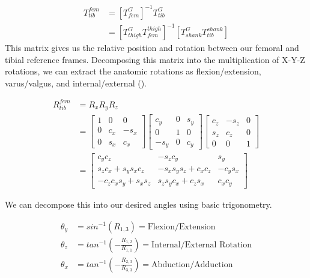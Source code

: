\documentclass{article}
\begin{document}
    \begin{equation}
        \begin{aligned}
            T^{fem}_{tib} &= [T^{G}_{fem}]^{-1}T^{G}_{tib} \\
            &= [T^{G}_{thigh}T^{thigh}_{fem}]^{-1}[T^{G}_{shank}T^{shank}_{tib}]
        \end{aligned}
        \label{t_fem_tib}
    \end{equation}
    This matrix gives us the relative position and rotation between our femoral and tibial reference frames. Decomposing this matrix into the multiplication of X-Y-Z rotations, we can extract the anatomic rotations as flexion/extension, varus/valgus, and internal/external ().

    \begin{equation}
        \begin{aligned}
            R^{fem}_{tib} & = R_{x}R_{y}R_{z}\\
            &= \begin{bmatrix}1 & 0 & 0 \\ 0 & c_{x} & -s_{x} \\ 0 & s_{x} & c_{x} \end{bmatrix}
            \begin{bmatrix}c_{y} & 0 & s_{y}\\ 0 & 1 & 0 \\ -s_{y} & 0 & c_{y} \end{bmatrix}
            \begin{bmatrix} c_{z} & -s_{z} & 0 \\ s_{z} & c_{z} & 0 \\ 0 & 0 & 1 \end{bmatrix}\\
            &= \begin{bmatrix}
                c_{y}c_{z} & -s_{z}c_{y} & s_{y} \\
                s_{z}c_{x} + s_{y}s_{x}c_{z} & -s_{x}s_{y}s_{z} + c_{x}c_{z} & -c_{y}s_{x} \\
                -c_{z}c_{x}s_{y} + s_{x}s_{z} & s_{z}s_{y}c_{x} + c_{z}s_{x}  & c_{x}c_{y}
            \end{bmatrix}
        \end{aligned}
        \label{rot}
    \end{equation}

    We can decompose this into our desired angles using basic trigonometry.

    \begin{equation}
        \begin{aligned}
            \theta_{y} &= sin^{-1}(R_{1,3}) = \text{Flexion/Extension} \\
            \theta_{z} & = tan^{-1}(-\frac{R_{1,2}}{R_{1,1}}) = \text{Internal/External Rotation} \\
            \theta_{x} & = tan^{-1}(-\frac{R_{2,3}}{R_{3,3}}) = \text{Abduction/Adduction}
        \end{aligned}
    \end{equation}
\end{document}
